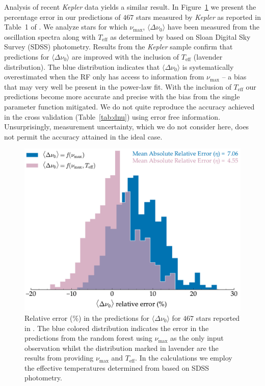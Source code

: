 Analysis of recent \emph{Kepler} data yields a similar result. In Figure~\ref{fig:chap} we present the percentage error in our predictions of $467$ stars measured by \emph{Kepler} as reported in Table~1 of \citet{2014ApJS..210....1C}. We analyze stars for which $\nu_{\max}$, ${\langle\Delta\nu_0\rangle}$ have been measured from the oscillation spectra along with  $T_{\text{eff}}$ as determined by \citet{2012ApJS..199...30P} based on Sloan Digital Sky Survey (SDSS) photometry. Results from the \emph{Kepler} sample confirm that predictions for ${\langle\Delta\nu_0\rangle}$ are improved with the inclusion of $T_{\text{eff}}$ (lavender distribution). The blue distribution indicates that ${\langle\Delta\nu_0\rangle}$ is systematically overestimated when the RF only has access to information from $\nu_{\max}$ -- a bias that may very well be present in the power-law fit. With the inclusion of $T_{\text{eff}}$ our predictions become more accurate and precise with the bias from the single parameter function mitigated. We do not quite reproduce the accuracy achieved in the cross validation (Table~\ref{tab:dnu}) using error free information.  Unsurprisingly,  measurement uncertainty, which we do not consider here, does not permit the accuracy attained in the ideal case.


\begin{figure}
\centering
\includegraphics[width=0.9\linewidth]{chaplin.pdf}
\caption[Relative error in predictions for $\Delta\nu$]{Relative error (\%) in the predictions for ${\langle\Delta\nu_0\rangle}$ for $467$ stars reported in \citet{2014ApJS..210....1C}. The blue colored distribution indicates the error in the predictions from the random forest using $\nu_{\max}$ as the only input observation whilst the distribution marked in lavender are the results from providing $\nu_{\max}$ and $T_{\text{eff}}$. In the calculations we employ the effective temperatures determined from \citet{2012ApJS..199...30P} based on  SDSS photometry.} 
\label{fig:chap}
\end{figure}



